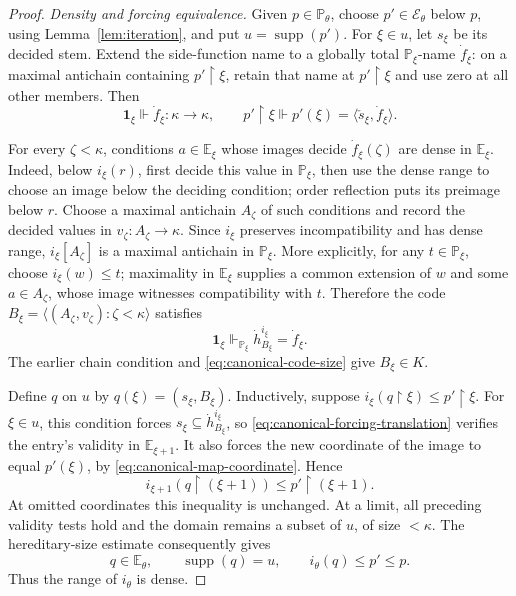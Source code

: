 \documentclass[11pt,a4paper]{amsart}
\theoremstyle{definition}
\theoremstyle{remark}
\newcommand{\PP}{\mathbb P}
\newcommand{\EE}{\mathbb E}
\DeclareMathOperator{\supp}{supp}
\begin{document}
\begin{proof}
\emph{Density and forcing equivalence.}
Given \(p\in\PP_\theta\), choose
\(p'\in\mathcal E_\theta\) below \(p\), using
Lemma~\ref{lem:iteration}, and put \(u=\supp(p')\).
For \(\xi\in u\), let \(s_\xi\) be its decided
stem. Extend the side-function name to a globally total
\(\PP_\xi\)-name \(\dot f_\xi\): on a maximal
antichain containing \(p'\restriction\xi\), retain
that name at \(p'\restriction\xi\) and use zero at
all other members. Then
\[
 \mathbf1_\xi\Vdash\dot f_\xi:\kappa\to\kappa,
 \qquad p'\restriction\xi\Vdash
          p'(\xi)=\langle\check s_\xi,\dot f_\xi\rangle.
\]

For every \(\zeta<\kappa\), conditions \(a\in\EE_\xi\)
whose images decide \(\dot f_\xi(\zeta)\) are dense
in \(\EE_\xi\). Indeed, below \(i_\xi(r)\),
first decide this value in \(\PP_\xi\), then use the
dense range to choose an image below the deciding
condition; order reflection puts its preimage below \(r\).
Choose a maximal antichain \(A_\zeta\) of such
conditions and record the decided values in
\(v_\zeta:A_\zeta\to\kappa\). Since \(i_\xi\)
preserves incompatibility and has dense range,
\(i_\xi[A_\zeta]\) is a maximal antichain in
\(\PP_\xi\). More explicitly, for any
\(t\in\PP_\xi\), choose \(i_\xi(w)\leq t\);
maximality in \(\EE_\xi\) supplies a common extension
of \(w\) and some \(a\in A_\zeta\), whose image
witnesses compatibility with \(t\). Therefore the code
\(B_\xi=\langle(A_\zeta,v_\zeta):\zeta<\kappa\rangle\)
satisfies
\[
 \mathbf1_\xi\Vdash_{\PP_\xi}
                    \dot h_{B_\xi}^{i_\xi}=\dot f_\xi.
\]
The earlier chain condition and
\eqref{eq:canonical-code-size} give \(B_\xi\in K\).

Define \(q\) on \(u\) by \(q(\xi)=(s_\xi,B_\xi)\).
Inductively, suppose
\(i_\xi(q\restriction\xi)\leq p'\restriction\xi\).
For \(\xi\in u\), this condition forces
\(s_\xi\subseteq\dot h_{B_\xi}^{i_\xi}\), so
\eqref{eq:canonical-forcing-translation} verifies the
entry's validity in \(\EE_{\xi+1}\). It also forces
the new coordinate of the image to equal \(p'(\xi)\),
by \eqref{eq:canonical-map-coordinate}. Hence
\[
 i_{\xi+1}(q\restriction(\xi+1))
                       \leq p'\restriction(\xi+1).
\]
At omitted coordinates this inequality is unchanged.
At a limit, all preceding validity tests hold and the
domain remains a subset of \(u\), of size \(<\kappa\).
The hereditary-size estimate consequently gives
\[
 q\in\EE_\theta,\qquad
 \supp(q)=u,\qquad i_\theta(q)\leq p'\leq p.
\]
Thus the range of \(i_\theta\) is dense.


\end{proof}
\end{document}

